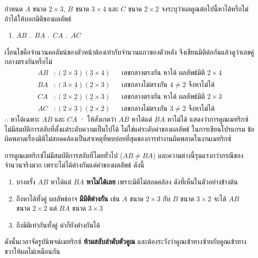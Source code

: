 \begin{ex}
\label{ex:multiply-conformable}
กำหนด $A$ ขนาด $2 \times 3$, $B$ ขนาด $3 \times 4$ และ $C$ ขนาด $2 \times 2$ จงระบุว่าผลคูณต่อไปนี้หาได้หรือไม่ ถ้าได้ให้บอกมิติของผลลัพธ์
\begin{enumerate}
    \item $AB$ .\ $BA$ .\ $CA$ .\ $AC$
\end{enumerate}
\end{ex}
\begin{solution}
เงื่อนไขคือจำนวนคอลัมน์ของตัวหน้าต้องเท่ากับจำนวนแถวของตัวหลัง จึงเขียนมิติต่อกันแล้วดูว่าเลขคู่กลางตรงกันหรือไม่
\begin{align*}
AB &: (2 \times \underline{3})(\underline{3} \times 4) && \text{เลขกลางตรงกัน หาได้ ผลลัพธ์มิติ } 2 \times 4\\
BA &: (3 \times \underline{4})(\underline{2} \times 3) && \text{เลขกลางไม่ตรงกัน } 4 \neq 2 \text{ จึงหาไม่ได้}\\
CA &: (2 \times \underline{2})(\underline{2} \times 3) && \text{เลขกลางตรงกัน หาได้ ผลลัพธ์มิติ } 2 \times 3\\
AC &: (2 \times \underline{3})(\underline{2} \times 2) && \text{เลขกลางไม่ตรงกัน } 3 \neq 2 \text{ จึงหาไม่ได้}
\end{align*}
$\therefore$ หาได้เฉพาะ $AB$ และ $CA$ · ให้สังเกตว่า $AB$ หาได้แต่ $BA$ หาไม่ได้ แสดงว่าการคูณเมทริกซ์ไม่มีสมบัติการสลับที่ตั้งแต่ระดับความเป็นไปได้ ไม่ใช่แค่ระดับค่าของผลลัพธ์ ในการเขียนโปรแกรม ข้อผิดพลาดเรื่องมิติไม่สอดคล้องเป็นสาเหตุที่พบบ่อยที่สุดของการทำงานผิดพลาดในงานเมทริกซ์ \solhere
\end{solution}

\begin{warning}
การคูณเมทริกซ์ไม่มีสมบัติการสลับที่โดยทั่วไป ($AB \neq BA$) และความต่างนี้รุนแรงกว่ากรณีของจำนวนจริงมาก เพราะไม่ได้ต่างกันแค่ค่าของผลลัพธ์ ดังนี้

\begin{enumerate}
    \item บางครั้ง $AB$ หาได้แต่ $BA$ \textbf{หาไม่ได้เลย} เพราะมิติไม่สอดคล้อง ดังที่เห็นในตัวอย่างข้างต้น
    \item ถึงหาได้ทั้งคู่ ผลลัพธ์อาจ \textbf{มีมิติต่างกัน} เช่น $A$ ขนาด $2 \times 3$ กับ $B$ ขนาด $3 \times 2$ จะได้ $AB$ ขนาด $2 \times 2$ แต่ $BA$ ขนาด $3 \times 3$
    \item ถึงมิติเท่ากันทั้งคู่ ค่าก็ยังต่างกันได้
\end{enumerate}

ดังนั้นเวลาจัดรูปนิพจน์เมทริกซ์ \textbf{ห้ามสลับลำดับตัวคูณ} และต้องระวังว่าคูณเข้าทางซ้ายกับคูณเข้าทางขวาให้ผลไม่เหมือนกัน
\end{warning}

